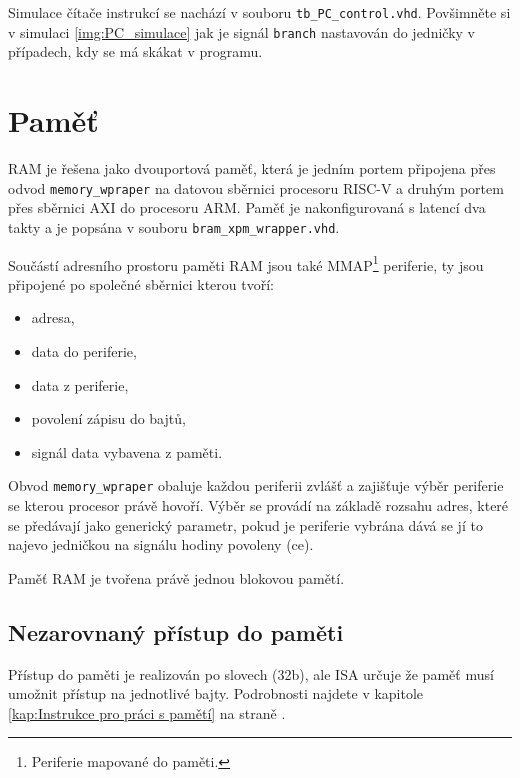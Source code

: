 \documentclass[FM,BP]{tulthesis}
\begin{document}
Simulace čítače instrukcí se nachází v souboru \verb|tb_PC_control.vhd|. Povšimněte si v simulaci \ref{img:PC_simulace} jak je signál \verb|branch| nastavován do jedničky v případech, kdy se má skákat v programu.

\section{Paměť}
RAM je řešena jako dvouportová paměť, která je jedním portem připojena přes odvod \verb|memory_wpraper| na datovou sběrnici procesoru RISC-V a druhým portem přes sběrnici AXI do procesoru ARM. Paměť je nakonfigurovaná s latencí dva takty a je popsána v souboru \verb|bram_xpm_wrapper.vhd|. 

Součástí adresního prostoru paměti RAM jsou také MMAP\footnote{Periferie mapované do paměti.} periferie, ty jsou připojené po společné sběrnici kterou tvoří:
\begin{itemize}
    \item adresa,
    \item data do periferie,
    \item data z periferie,
    \item povolení zápisu do bajtů,
    \item signál data vybavena z paměti.
\end{itemize}

Obvod \verb|memory_wpraper| obaluje každou periferii zvlášť a zajišťuje výběr periferie se kterou procesor právě hovoří. Výběr se provádí na základě rozsahu adres, které se předávají jako generický parametr, pokud je periferie vybrána dává se jí to najevo jedničkou na signálu hodiny povoleny (ce).

Paměť RAM je tvořena právě jednou blokovou pamětí.

\subsection{Nezarovnaný přístup do paměti}
Přístup do paměti je realizován po slovech (32b), ale ISA určuje že paměť musí umožnit přístup na jednotlivé bajty. Podrobnosti najdete v kapitole \ref{kap:Instrukce pro práci s pamětí} na straně \pageref{kap:Instrukce pro práci s pamětí}. 
\end{document}
